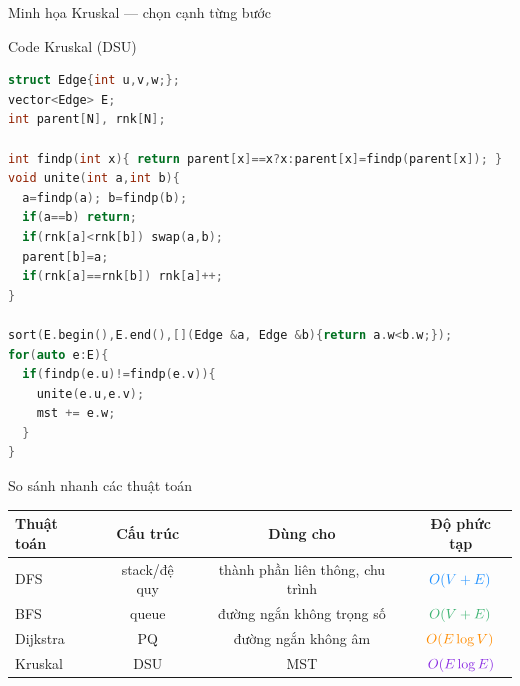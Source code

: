 \documentclass{beamer}
\newcommand{\hlblue}[1]{\textcolor{myblue}{#1}}
\newcommand{\hlgreen}[1]{\textcolor{mygreen}{#1}}
\newcommand{\hlpurple}[1]{\textcolor{mypurple}{#1}}
\newcommand{\hlorange}[1]{\textcolor{myorange}{#1}}
\newcommand{\hlcyan}[1]{\textcolor{mycyan}{#1}}
\begin{document}
\begin{frame}{\hlorange{Minh họa Kruskal} — chọn cạnh từng bước}
\centering
{}
\end{frame}

\begin{frame}[fragile]{\hlorange{Code Kruskal} (DSU)}
\begin{lstlisting}[language=C++]
struct Edge{int u,v,w;};
vector<Edge> E;
int parent[N], rnk[N];

int findp(int x){ return parent[x]==x?x:parent[x]=findp(parent[x]); }
void unite(int a,int b){
  a=findp(a); b=findp(b);
  if(a==b) return;
  if(rnk[a]<rnk[b]) swap(a,b);
  parent[b]=a;
  if(rnk[a]==rnk[b]) rnk[a]++;
}

sort(E.begin(),E.end(),[](Edge &a, Edge &b){return a.w<b.w;});
for(auto e:E){
  if(findp(e.u)!=findp(e.v)){
    unite(e.u,e.v);
    mst += e.w;
  }
}
\end{lstlisting}
\end{frame}

\begin{frame}{\hlpurple{So sánh nhanh các thuật toán}}
\begin{center}
\begin{tabular}{l|c|c|c}
\rowcolor{tablehead}\color{tableheadtxt} Thuật toán & \color{tableheadtxt}Cấu trúc & \color{tableheadtxt}Dùng cho & \color{tableheadtxt}Độ phức tạp\\\hline
\hlblue{DFS} & stack/đệ quy & thành phần liên thông, chu trình & \(\hlblue{O(V+E)}\)\\
\hlgreen{BFS} & queue & đường ngắn không trọng số & \(\hlgreen{O(V+E)}\)\\
\hlorange{Dijkstra} & PQ & đường ngắn không âm & \(\hlorange{O(E\log V)}\)\\
\hlpurple{Kruskal} & DSU & MST & \(\hlpurple{O(E\log E)}\)
\end{tabular}
\end{center}
\end{frame}
\end{document}
